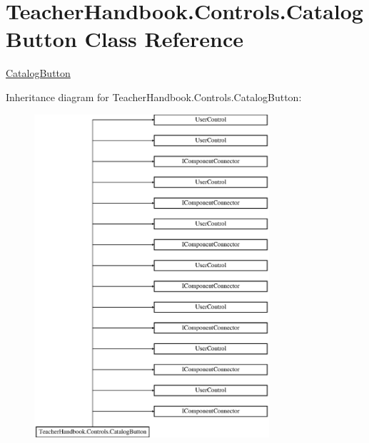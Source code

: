 \hypertarget{class_teacher_handbook_1_1_controls_1_1_catalog_button}{}\section{Teacher\+Handbook.\+Controls.\+Catalog\+Button Class Reference}
\label{class_teacher_handbook_1_1_controls_1_1_catalog_button}


\mbox{\hyperlink{class_teacher_handbook_1_1_controls_1_1_catalog_button}{Catalog\+Button}}  


Inheritance diagram for Teacher\+Handbook.\+Controls.\+Catalog\+Button\+:\begin{figure}[H]
\begin{center}
\leavevmode
\includegraphics[height=12.000000cm]{df/d61/class_teacher_handbook_1_1_controls_1_1_catalog_button}
\end{center}
\end{figure}
